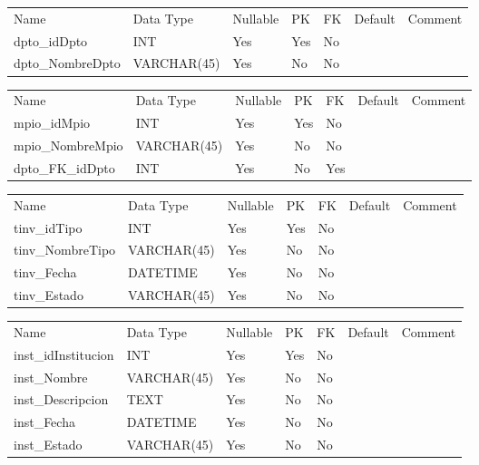 			\begin{center}
				\begin{tabular}{ |l|l|l|l|l|l|l| }
					\hline
					Name & Data Type & Nullable & PK & FK & Default & Comment \\
					dpto_idDpto & INT & Yes & Yes & No &  & \\ \hline 
dpto_NombreDpto & VARCHAR(45) & Yes & No & No &  & \\ \hline 

				\end{tabular}
			\end{center}
		

			\begin{center}
				\begin{tabular}{ |l|l|l|l|l|l|l| }
					\hline
					Name & Data Type & Nullable & PK & FK & Default & Comment \\
					mpio_idMpio & INT & Yes & Yes & No &  & \\ \hline 
mpio_NombreMpio & VARCHAR(45) & Yes & No & No &  & \\ \hline 
dpto_FK_idDpto & INT & Yes & No & Yes &  & \\ \hline 

				\end{tabular}
			\end{center}
		

			\begin{center}
				\begin{tabular}{ |l|l|l|l|l|l|l| }
					\hline
					Name & Data Type & Nullable & PK & FK & Default & Comment \\
					tinv_idTipo & INT & Yes & Yes & No &  & \\ \hline 
tinv_NombreTipo & VARCHAR(45) & Yes & No & No &  & \\ \hline 
tinv_Fecha & DATETIME & Yes & No & No &  & \\ \hline 
tinv_Estado & VARCHAR(45) & Yes & No & No &  & \\ \hline 

				\end{tabular}
			\end{center}
		

			\begin{center}
				\begin{tabular}{ |l|l|l|l|l|l|l| }
					\hline
					Name & Data Type & Nullable & PK & FK & Default & Comment \\
					inst_idInstitucion & INT & Yes & Yes & No &  & \\ \hline 
inst_Nombre & VARCHAR(45) & Yes & No & No &  & \\ \hline 
inst_Descripcion & TEXT & Yes & No & No &  & \\ \hline 
inst_Fecha & DATETIME & Yes & No & No &  & \\ \hline 
inst_Estado & VARCHAR(45) & Yes & No & No &  & \\ \hline 

				\end{tabular}
			\end{center}
		

